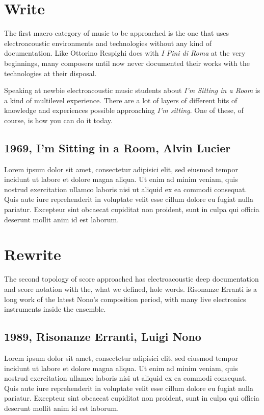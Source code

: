 \documentclass[twoside,a4paper]{article}
\begin{document}
\section{Write}
\label{sec:writing}

The first macro category of music to be approached is the one that uses electroacoustic environments and technologies without any kind of documentation. Like Ottorino Respighi does with \emph{I Pini di Roma} at the very beginnings, many composers until now never documented their works with the technologies at their disposal. 

Speaking at newbie electroacoustic music students about \emph{I'm Sitting in a Room} is a kind of multilevel experience. There are a lot of layers of different bits of knowledge and experiences possible approaching \emph{I'm sitting}. One of these, of course, is how you can do it today. 

\subsection{1969, I'm Sitting in a Room, Alvin Lucier}

Lorem ipsum dolor sit amet, consectetur adipisici elit, sed eiusmod tempor
incidunt ut labore et dolore magna aliqua. Ut enim ad minim veniam, quis
nostrud exercitation ullamco laboris nisi ut aliquid ex ea commodi consequat.
Quis aute iure reprehenderit in voluptate velit esse cillum dolore eu fugiat
nulla pariatur. Excepteur sint obcaecat cupiditat non proident, sunt in culpa
qui officia deserunt mollit anim id est laborum.

\section{Rewrite}
\label{sec:rewriting}

The second topology of score approached has electroacoustic deep documentation and score notation with the, what we defined, hole words. Risonanze Erranti is a long work of the latest Nono's composition period, with many live electronics instruments inside the ensemble. 

\subsection{1989, Risonanze Erranti, Luigi Nono}

Lorem ipsum dolor sit amet, consectetur adipisici elit, sed eiusmod tempor
incidunt ut labore et dolore magna aliqua. Ut enim ad minim veniam, quis
nostrud exercitation ullamco laboris nisi ut aliquid ex ea commodi consequat.
Quis aute iure reprehenderit in voluptate velit esse cillum dolore eu fugiat
nulla pariatur. Excepteur sint obcaecat cupiditat non proident, sunt in culpa
qui officia deserunt mollit anim id est laborum.
\end{document}
